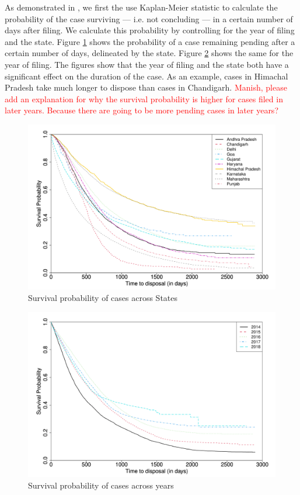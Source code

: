 As demonstrated in \textcite{datta2017_itatDelays}, we first the use Kaplan-Meier statistic to calculate the probability of the case surviving --- i.e. not concluding --- in a certain number of days after filing. We calculate this probability by controlling for the year of filing and the state. Figure \ref{fig:stateSurvival} shows the probability of a case remaining pending after a certain number of days, delineated by the state. Figure \ref{fig:yearSurvival} shows the same for the year of filing. The figures show that the year of filing and the state both have a significant effect on the duration of the case. As an example, cases in Himachal Pradesh take much longer to dispose than cases in Chandigarh. \textcolor{red}{Manish, please add an explanation for why the survival probability is higher for cases filed in later years. Because there are going to be more pending cases in later years?}

\begin{figure}[h!]
 \centering
 \caption{Survival probability of cases across States}\label{fig:stateSurvival}
 \includegraphics[width = \textwidth]{surv_states-1.png}
\end{figure}

\begin{figure}[h!]
 \centering
 \caption{Survival probability of cases across years}\label{fig:yearSurvival}
 \includegraphics[width = \textwidth]{surv_years-1.png}
\end{figure}

